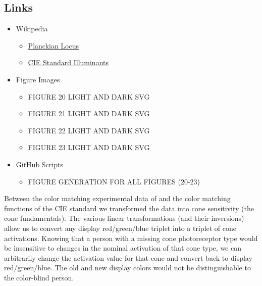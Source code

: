\documentclass[twocolumn]{article}
\begin{document}
\subsection{Links}
\begin{itemize}
    \item Wikipedia
    \begin{itemize}
        \item \href{https://en.wikipedia.org/wiki/Planckian_locus}{Planckian Locus}
        \item \href{https://en.wikipedia.org/wiki/Standard_illuminant}{CIE Standard Illuminants}
    \end{itemize}
    \item Figure Images
    \begin{itemize}
        \item FIGURE 20 LIGHT AND DARK SVG
        \item FIGURE 21 LIGHT AND DARK SVG
        \item FIGURE 22 LIGHT AND DARK SVG
        \item FIGURE 23 LIGHT AND DARK SVG
    \end{itemize}
    \item GitHub Scripts
    \begin{itemize}
        \item FIGURE GENERATION FOR ALL FIGURES (20-23)
    \end{itemize}
\end{itemize}
Between the color matching experimental data of \cite{stiles1959npl} and the color matching functions of the CIE standard we transformed the data into cone sensitivity (the cone fundamentals).  The various linear transformations (and their inversions) allow us to convert any display red/green/blue triplet into a triplet of cone activations.  Knowing that a person with a missing cone photoreceptor type would be insensitive to changes in the nominal activation of that cone type, we can arbitrarily change the activation value for that cone and convert back to display red/green/blue.  The old and new display colors would not be distinguishable to the color-blind person.
\end{document}
